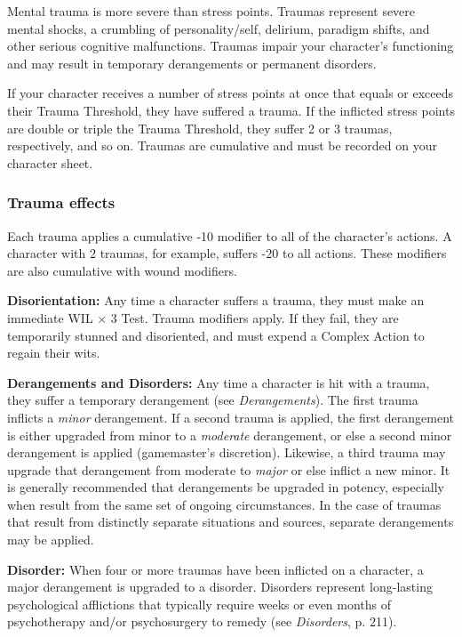Mental trauma is more severe than stress points. Traumas represent severe mental shocks, a crumbling of personality/self, delirium, paradigm shifts, and other serious cognitive malfunctions. Traumas impair your character’s functioning and may result in temporary derangements or permanent disorders. 

If your character receives a number of stress points at once that equals or exceeds their Trauma Threshold, they have suffered a trauma. If the inflicted stress points are double or triple the Trauma Threshold, they suffer 2 or 3 traumas, respectively, and so on. Traumas are cumulative and must be recorded on your character sheet. 

\subsubsection{Trauma effects} 

Each trauma applies a cumulative -10 modifier to all of the character’s actions. A character with 2 traumas, for example, suffers -20 to all actions. These modifiers are also cumulative with wound modifiers. 

\textbf{Disorientation:} Any time a character suffers a trauma, they must make an immediate WIL $\times$ 3 Test. Trauma modifiers apply. If they fail, they are temporarily stunned and disoriented, and must expend a Complex Action to regain their wits. 

\textbf{Derangements and Disorders:} Any time a character is hit with a trauma, they suffer a temporary derangement (see \emph{Derangements}). The first trauma inflicts a \emph{minor} derangement. If a second trauma is applied, the first derangement is either upgraded from minor to a \emph{moderate} derangement, or else a second minor derangement is applied (gamemaster’s discretion). Likewise, a third trauma may upgrade that derangement from moderate to \emph{major} or else inflict a new minor. It is generally recommended that derangements be upgraded in potency, especially when result from the same set of ongoing circumstances. In the case of traumas that result from distinctly separate situations and sources, separate derangements may be applied. 

\textbf{Disorder:} When four or more traumas have been inflicted on a character, a major derangement is upgraded to a disorder. Disorders represent long-lasting psychological afflictions that typically require weeks or even months of psychotherapy and/or psychosurgery to remedy (see \emph{Disorders}, p. 211). 




